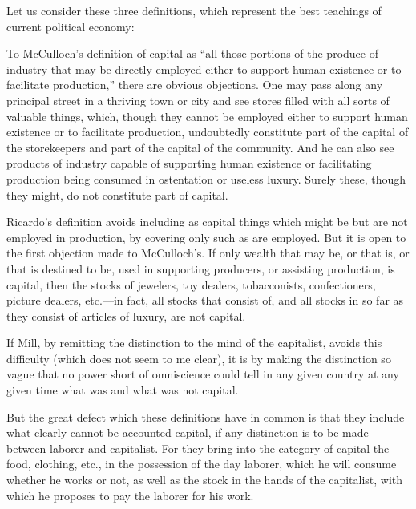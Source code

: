Let us consider these three definitions, which represent the best
teachings of current political economy:

To McCulloch's definition of capital as ``all those portions of the
produce of industry that may be directly employed either to support
human existence or to facilitate production,'' there are obvious
objections. One may pass along any principal street in a thriving town
or city and see stores filled with all sorts of valuable things, which,
though they cannot be employed either to support human existence or to
facilitate production, undoubtedly constitute part of the capital of the
storekeepers and part of the capital of the community. And he can also
see products of industry capable of supporting human existence or
facilitating production being consumed in ostentation or useless luxury.
Surely these, though they might, do not constitute part of capital.

Ricardo's definition avoids including as capital things which might be
but are not employed in production, by covering only such as are
employed. But it is open to the first objection made to McCulloch's. If
only wealth that may be, or that is, or that is destined to be, used in
supporting producers, or assisting production, is capital, then the
stocks of jewelers, toy dealers, tobacconists, confectioners, picture
dealers, etc.---in fact, all stocks that consist of, and all stocks in
so far as they consist of articles of luxury, are not capital.

If Mill, by remitting the distinction to the mind of the capitalist,
avoids this difficulty (which does not seem to me clear), it is by
making the distinction so vague that no power short of omniscience could
tell in any given country at any given time what was and what was not
capital.

But the great defect which these definitions have in common is that they
include what clearly cannot be accounted capital, if any distinction is
to be made between laborer and capitalist. For they bring into the
category of capital the food, clothing, etc., in the possession of the
day laborer, which he will consume whether he works or not, as well as
the stock in the hands of the capitalist, with which he proposes to pay
the laborer for his work.


